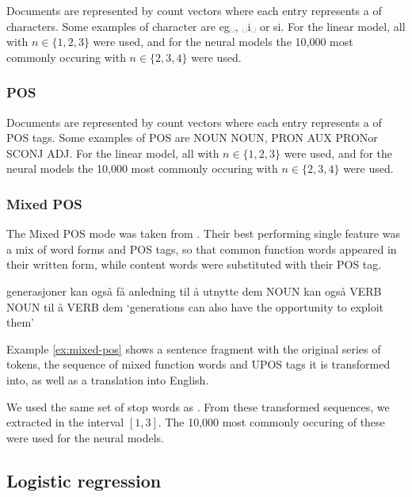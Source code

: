 Documents are represented by count vectors where each entry represents a
\ngram of characters. Some examples of character \ngrams are \textlangle
eg␣\textrangle, \textlangle␣i␣\textrangle\xspace or \textlangle si\textrangle. For
the linear model, all \ngrams with $n\in \{1,2,3\}$ were used, and for the
neural models the 10,000 most commonly occuring \ngrams with $n\in \{2,3,4\}$
were used.

\subsubsection*{POS \ngrams}

Documents are represented by count vectors where each entry represents a
\ngram of POS tags. Some examples of POS \ngrams are \textlangle NOUN
NOUN\textrangle, \textlangle PRON AUX PRON\textrangle or \textlangle SCONJ
ADJ\textrangle. For the linear model, all \ngrams with $n\in \{1,2,3\}$ were
used, and for the neural models the 10,000 most commonly occuring \ngrams
with $n\in \{2,3,4\}$ were used.

\subsubsection*{Mixed POS}

The Mixed POS mode was taken from \textcite{malmasi15}. Their best performing
single feature was a mix of word forms and POS tags, so that common function
words appeared in their written form, while content words were substituted
with their POS tag.

\begin{example}
\gll generasjoner kan også få   anledning til å utnytte dem
     NOUN         kan også VERB NOUN      til å VERB    dem
\glt `generations can also have the opportunity to exploit them'
\glend
\label{ex:mixed-pos}
\end{example}

Example \ref{ex:mixed-pos} shows a sentence fragment with the original series
of tokens, the sequence of mixed function words and UPOS tags it is
transformed into, as well as a translation into English.

We used the same set of stop words as \citeauthor{malmasi15}. From these
transformed sequences, we extracted \ngrams in the interval $[1,3]$. The
10,000 most commonly occuring of these were used for the neural models.


\subsection{Logistic regression}

